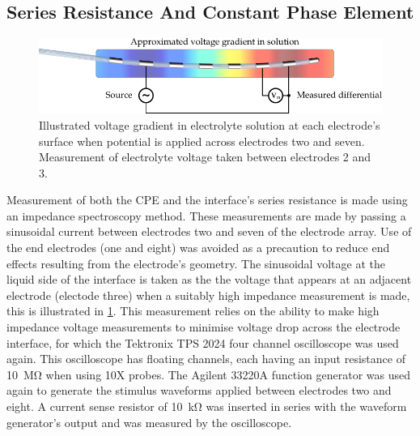     \subsection{Series Resistance And Constant Phase Element}
      \begin{figure}
        \centering
        \includegraphics{content/pt2/08-InterfaceParameters/graphics/measurement_CPE}
        \caption{\label{fig:pt2-measurement_CPE}Illustrated voltage gradient in electrolyte solution at each electrode's surface when potential is applied across electrodes two and seven. Measurement of electrolyte voltage taken between electrodes 2 and 3.}
      \end{figure}
      Measurement of both the CPE and the interface's series resistance is made using an impedance spectroscopy method.
      These measurements are made by passing a sinusoidal current between electrodes two and seven of the electrode array.
      Use of the end electrodes (one and eight) was avoided as a precaution to reduce end effects resulting from the electrode's geometry.
      The sinusoidal voltage at the liquid side of the interface is taken as the the voltage that appears at an adjacent electrode (electode three) when a suitably high impedance measurement is made, this is illustrated in \cref{fig:pt2-measurement_CPE}.
      This measurement relies on the ability to make high impedance voltage measurements to minimise voltage drop across the electrode interface, for which the Tektronix TPS 2024 four channel oscilloscope was used again.
      This oscilloscope has floating channels, each having an input resistance of \SI{10}{\mega\ohm} when using 10X probes.
      The Agilent 33220A function generator was used again to generate the stimulus waveforms applied between electrodes two and eight.
      A current sense resistor of \SI{10}{\kilo\ohm} was inserted in series with the waveform generator's output and was measured by the oscilloscope.
